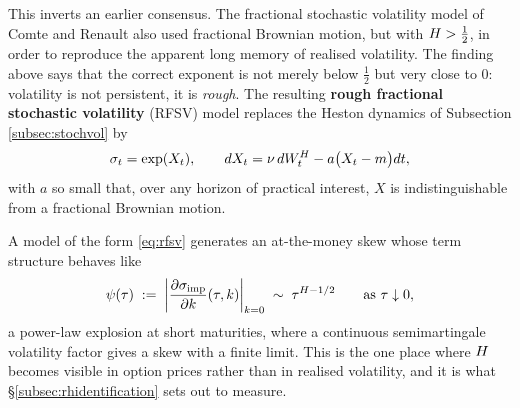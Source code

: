 
This inverts an earlier consensus. The fractional stochastic volatility model of Comte and Renault
\cite{comterenault1998} also used fractional Brownian motion, but with $H > \tfrac12$, in order
to reproduce the apparent long memory of realised volatility. The finding above says that the
correct exponent is not merely below $\tfrac12$ but very close to $0$: volatility is not
persistent, it is \emph{rough}. The resulting \textbf{rough fractional stochastic volatility}
(RFSV) model replaces the Heston dynamics of Subsection \ref{subsec:stochvol} by
\begin{equation}\label{eq:rfsv}
\sigma_t = \exp(X_t), \qquad d X_t = \nu\,d W^{H}_t - a\bigl(X_t - m\bigr)d t,
\end{equation}
with $a$ so small that, over any horizon of practical interest, $X$ is indistinguishable from
a fractional Brownian motion.

A model of the form \eqref{eq:rfsv} generates an at-the-money skew whose term structure behaves like
\begin{equation}\label{eq:skewpowerlaw}
\psi(\tau) \;:=\; \biggl|\frac{\partial \sigma_{\mathrm{imp}}}{\partial k}(\tau,k)\biggr|_{k=0} \;\sim\; \tau^{H - 1/2}
\qquad \text{as } \tau \downarrow 0 ,
\end{equation}
a power-law explosion at short maturities, where a continuous semimartingale volatility factor gives
a skew with a finite limit. This is the one place where $H$ becomes visible in option prices
rather than in realised volatility, and it is what \S\ref{subsec:rhidentification} sets out to
measure.


